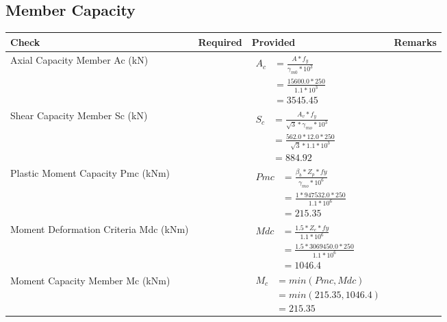 \documentclass{article}%
\begin{document}
\subsection{Member Capacity}%
\label{subsec:MemberCapacity}%
\renewcommand{\arraystretch}{1.2}%
\begin{longtable}{|p{4cm}|p{5cm}|p{5.5cm}|p{1.5cm}|}%
\hline%
\rowcolor{OsdagGreen}%
Check&Required&Provided&Remarks\\%
\hline%
\endhead%
\hline%
Axial Capacity Member Ac (kN)&&$\begin{aligned} A_c &=\frac{A*f_y}{\gamma_{m0} *10^3}\\ &=\frac{15600.0*250}{1.1* 10^3}\\ &=3545.45\end{aligned}$&\\%
\hline%
Shear Capacity Member Sc (kN)&&$\begin{aligned} S_c &= \frac{A_v*f_y}{\sqrt{3}*\gamma_{mo} *10^3}\\ &=\frac{562.0*12.0*250}{\sqrt{3}*1.1 *10^3}\\ &=884.92\end{aligned}$&\\%
\hline%
Plastic Moment Capacity Pmc (kNm)&&$\begin{aligned} Pmc &= \frac{\beta_b * Z_p *fy}{\gamma_{mo} * 10^6}\\ &=\frac{1*947532.0*250}{1.1 * 10^6}\\ &=215.35\end{aligned}$&\\%
\hline%
Moment Deformation Criteria Mdc (kNm)&&$\begin{aligned} Mdc &= \frac{1.5 *Z_e *fy}{1.1* 10^6}\\ &= \frac{1.5 *3069450.0*250}{1.1* 10^6}\\ &= 1046.4\end{aligned}$&\\%
\hline%
Moment Capacity Member Mc (kNm)&&$\begin{aligned} M_c &= min(Pmc,Mdc)\\ &=min(215.35,1046.4)\\ &=215.35\end{aligned}$&\\%
\hline%
\end{longtable}

%
\newpage%
\end{document}
